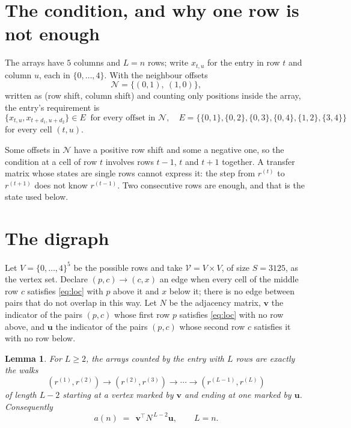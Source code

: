 \documentclass[11pt,a4paper]{article}
\theoremstyle{plain}
\newtheorem{lemma}[theorem]{Lemma}
\theoremstyle{definition}
\begin{document}
\section{The condition, and why one row is not enough}

The arrays have $5$ columns and $L=n$ rows; write $x_{t,u}$ for the entry in
row $t$ and column $u$, each in $\{0,\dots,4\}$. With the neighbour offsets
\[
\mathcal N=\{(0,1),\ (1,0)\},
\]
written as (row shift, column shift) and counting only positions inside the array, the
entry's requirement is
\begin{equation}\label{eq:loc}
\{x_{t,u},x_{t+d_1,u+d_2}\}\in E\ \text{ for every offset in }\mathcal N,\quad E=\{\{0,1\},\{0,2\},\{0,3\},\{0,4\},\{1,2\},\{3,4\}\}
\end{equation}
for every cell $(t,u)$.

Some offsets in $\mathcal N$ have a positive row shift and some a negative one, so the
condition at a cell of row $t$ involves rows $t-1$, $t$ and $t+1$ together. A transfer
matrix whose states are single rows cannot express it: the step from $r^{(t)}$ to
$r^{(t+1)}$ does not know $r^{(t-1)}$. Two consecutive rows are enough, and that is
the state used below.

\section{The digraph}

Let $V=\{0,\dots,4\}^{5}$ be the possible rows and take
$\mathcal V=V\times V$, of size $S=3125$, as the vertex set. Declare $(p,c)\to(c,x)$ an edge
when every cell of the middle row $c$ satisfies \eqref{eq:loc} with $p$ above it and $x$
below it; there is no edge between pairs that do not overlap in this way. Let $N$ be the
adjacency matrix, $\mathbf{v}$ the indicator of the pairs $(p,c)$ whose first row $p$
satisfies \eqref{eq:loc} with no row above, and $\mathbf{u}$ the indicator of
the pairs $(p,c)$ whose second row $c$ satisfies it with no row below.

\begin{lemma}\label{lem:walk}
For $L\ge2$, the arrays counted by the entry with $L$ rows are exactly the walks
\[
(r^{(1)},r^{(2)})\to(r^{(2)},r^{(3)})\to\cdots\to(r^{(L-1)},r^{(L)})
\]
of length $L-2$ starting at a vertex marked by $\mathbf{v}$ and ending at one marked by
$\mathbf{u}$. Consequently
\[
a(n)\;=\;\,\mathbf{v}^{\!\top}N^{\,L-2}\mathbf{u},\qquad L=n .
\]
\end{lemma}
\end{document}
